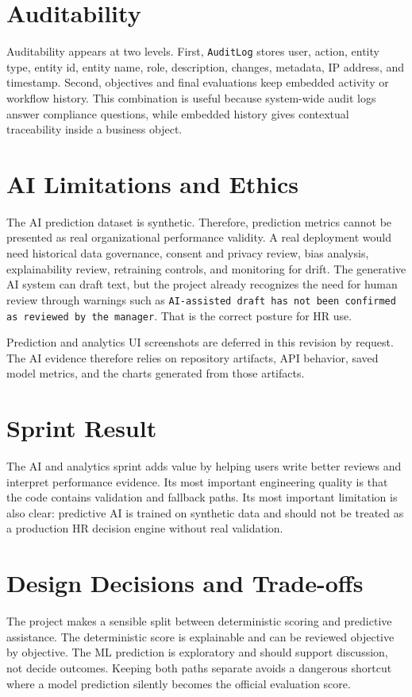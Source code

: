 \section{Auditability}
Auditability appears at two levels. First, \texttt{AuditLog} stores user, action, entity type, entity id, entity name, role, description, changes, metadata, IP address, and timestamp. Second, objectives and final evaluations keep embedded activity or workflow history. This combination is useful because system-wide audit logs answer compliance questions, while embedded history gives contextual traceability inside a business object.

\section{AI Limitations and Ethics}
The AI prediction dataset is synthetic. Therefore, prediction metrics cannot be presented as real organizational performance validity. A real deployment would need historical data governance, consent and privacy review, bias analysis, explainability review, retraining controls, and monitoring for drift. The generative AI system can draft text, but the project already recognizes the need for human review through warnings such as \texttt{AI-assisted draft has not been confirmed as reviewed by the manager}. That is the correct posture for HR use.

Prediction and analytics UI screenshots are deferred in this revision by request. The AI evidence therefore relies on repository artifacts, API behavior, saved model metrics, and the charts generated from those artifacts.

\section{Sprint Result}
The AI and analytics sprint adds value by helping users write better reviews and interpret performance evidence. Its most important engineering quality is that the code contains validation and fallback paths. Its most important limitation is also clear: predictive AI is trained on synthetic data and should not be treated as a production HR decision engine without real validation.

\section{Design Decisions and Trade-offs}
The project makes a sensible split between deterministic scoring and predictive assistance. The deterministic score is explainable and can be reviewed objective by objective. The ML prediction is exploratory and should support discussion, not decide outcomes. Keeping both paths separate avoids a dangerous shortcut where a model prediction silently becomes the official evaluation score.
